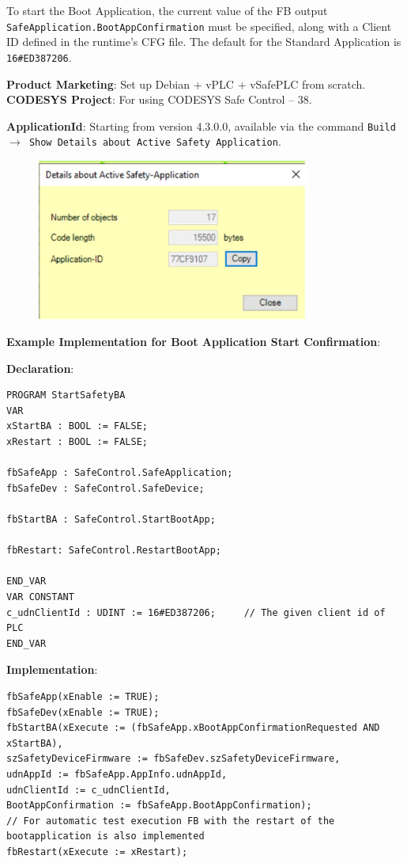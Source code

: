 \documentclass[a4paper,12pt]{article}
\begin{document}
To start the Boot Application, the current value of the FB output \texttt{SafeApplication.BootAppConfirmation} must be specified, along with a Client ID defined in the runtime's CFG file. The default for the Standard Application is \texttt{16\#ED387206}.

\textbf{Product Marketing}: Set up Debian + vPLC + vSafePLC from scratch. \\
\textbf{CODESYS Project}: For using CODESYS Safe Control – 38.

\textbf{ApplicationId}: Starting from version 4.3.0.0, available via the command \texttt{Build $\rightarrow$ Show Details about Active Safety Application}.
\begin{figure}[H]
	\centering
	\includegraphics[width=0.8\textwidth]{27.JPG}
\end{figure}

\textbf{Example Implementation for Boot Application Start Confirmation}:

\textbf{Declaration}:
\begin{lstlisting}
PROGRAM StartSafetyBA
VAR
xStartBA : BOOL := FALSE;
xRestart : BOOL := FALSE;

fbSafeApp : SafeControl.SafeApplication;
fbSafeDev : SafeControl.SafeDevice;

fbStartBA : SafeControl.StartBootApp;

fbRestart: SafeControl.RestartBootApp;

END_VAR
VAR CONSTANT
c_udnClientId : UDINT := 16#ED387206;     // The given client id of PLC
END_VAR
\end{lstlisting}

\textbf{Implementation}:
\begin{lstlisting}
fbSafeApp(xEnable := TRUE);
fbSafeDev(xEnable := TRUE);
fbStartBA(xExecute := (fbSafeApp.xBootAppConfirmationRequested AND xStartBA), 
szSafetyDeviceFirmware := fbSafeDev.szSafetyDeviceFirmware, 
udnAppId := fbSafeApp.AppInfo.udnAppId, 
udnClientId := c_udnClientId,
BootAppConfirmation := fbSafeApp.BootAppConfirmation);
// For automatic test execution FB with the restart of the bootapplication is also implemented
fbRestart(xExecute := xRestart);
\end{lstlisting}
\end{document}
